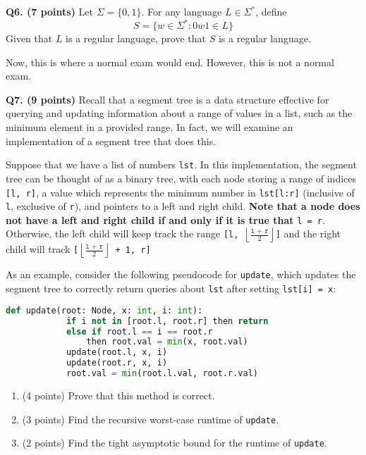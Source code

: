 \documentclass{article}
\begin{document}
    \pagebreak

    \noindent\textbf{Q6. (7 points)} Let \(\Sigma = \{0, 1\}\). For any language \(L \in \Sigma ^*\), define
    \[
        S = \{w \in \Sigma ^* : 0w1 \in L\}
    \]
    Given that \(L\) is a regular language, prove that \(S\) is a regular language.

    \pagebreak

    Now, this is where a normal exam would end. However, this is not a normal exam.

    \bigskip

    \noindent\textbf{Q7. (9 points)} Recall that a segment tree is a data structure effective for querying and updating information about a range of values in a list, such as the minimum element in a provided range. In fact, we will examine an implementation of a segment tree that does this.

    \medskip

    Suppose that we have a list of numbers \texttt{lst}. In this implementation, the segment tree can be thought of as a binary tree, with each node storing a range of indices \texttt{[l, r]}, a value which represents the minimum number in \texttt{lst[l:r]} (inclusive of \texttt{l}, exclusive of \texttt{r}), and pointers to a left and right child. \textbf{Note that a node does not have a left and right child if and only if it is true that} \texttt{l = r}. Otherwise, the left child will keep track the range \texttt{[l, \(\left\lfloor \frac{\texttt{l + r}}{2} \right\rfloor\)]} and the right child will track \texttt{[\(\left\lfloor \frac{\texttt{l + r}}{2} \right\rfloor\) + 1, r]}

    \medskip

    As an example, consider the following pseudocode for \texttt{update}, which updates the segment tree to correctly return queries about \texttt{lst} after setting \texttt{lst[i] = x}:

    \begin{lstlisting}[language=Python]
        def update(root: Node, x: int, i: int):
            if i not in [root.l, root.r] then return
            else if root.l == i == root.r
                then root.val = min(x, root.val)
            update(root.l, x, i)
            update(root.r, x, i)
            root.val = min(root.l.val, root.r.val)
    \end{lstlisting}
    \begin{enumerate}[label=\alph*)]
        \item (4 points) Prove that this method is correct.
        \pagebreak
        \item (3 points) Find the recursive worst-case runtime of \texttt{update}.
        \vfill
        \item (2 points) Find the tight asymptotic bound for the runtime of \texttt{update}.
        \vfill
    \end{enumerate}

    \pagebreak

    
\end{document}
